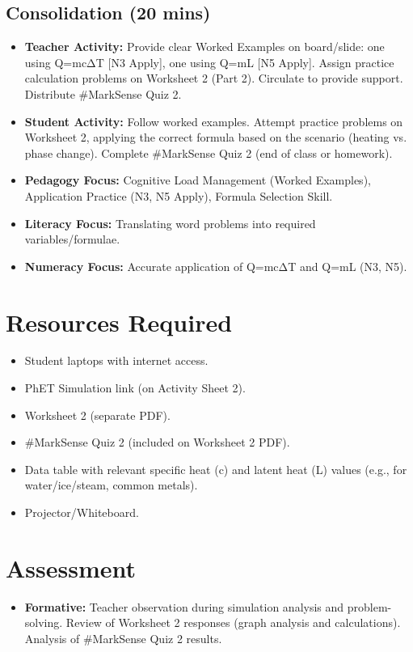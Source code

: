 \documentclass[11pt, a4paper]{article}
\begin{document}
\subsection*{Consolidation (20 mins)}
\begin{itemize}
    \item \textbf{Teacher Activity:} Provide clear Worked Examples on board/slide: one using Q=mcΔT [N3 Apply], one using Q=mL [N5 Apply]. Assign practice calculation problems on Worksheet 2 (Part 2). Circulate to provide support. Distribute \#MarkSense Quiz 2.
    \item \textbf{Student Activity:} Follow worked examples. Attempt practice problems on Worksheet 2, applying the correct formula based on the scenario (heating vs. phase change). Complete \#MarkSense Quiz 2 (end of class or homework).
    \item \textbf{Pedagogy Focus:} Cognitive Load Management (Worked Examples), Application Practice (N3, N5 Apply), Formula Selection Skill.
    \item \textbf{Literacy Focus:} Translating word problems into required variables/formulae.
    \item \textbf{Numeracy Focus:} Accurate application of Q=mcΔT and Q=mL (N3, N5).
\end{itemize}

\section*{Resources Required}
\begin{itemize}
    \item Student laptops with internet access.
    \item PhET Simulation link (on Activity Sheet 2).
    \item Worksheet 2 (separate PDF).
    \item \#MarkSense Quiz 2 (included on Worksheet 2 PDF).
    \item Data table with relevant specific heat (c) and latent heat (L) values (e.g., for water/ice/steam, common metals).
    \item Projector/Whiteboard.
\end{itemize}

\section*{Assessment}
\begin{itemize}
    \item \textbf{Formative:} Teacher observation during simulation analysis and problem-solving. Review of Worksheet 2 responses (graph analysis and calculations). Analysis of \#MarkSense Quiz 2 results.
\end{itemize}
\end{document}
